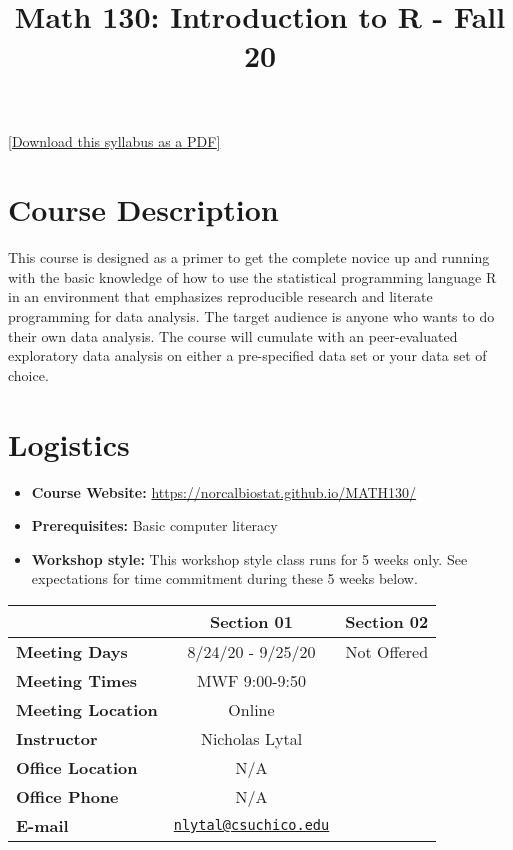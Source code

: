 \documentclass[
  11pt,
]{article}
\title{Math 130: Introduction to R - Fall 20}
\author{}
\date{\vspace{-2.5em}}
\providecommand{\tightlist}{%
  \setlength{\itemsep}{0pt}\setlength{\parskip}{0pt}}
\begin{document}
\maketitle

\href{syllabus.pdf}{{[}Download this syllabus as a PDF{]}}

\hypertarget{course-description}{%
\section{Course Description}\label{course-description}}

This course is designed as a primer to get the complete novice up and
running with the basic knowledge of how to use the statistical
programming language R in an environment that emphasizes reproducible
research and literate programming for data analysis. The target audience
is anyone who wants to do their own data analysis. The course will
cumulate with an peer-evaluated exploratory data analysis on either a
pre-specified data set or your data set of choice.

\hypertarget{logistics}{%
\section{Logistics}\label{logistics}}

\begin{itemize}
\tightlist
\item
  \textbf{Course Website:}
  \url{https://norcalbiostat.github.io/MATH130/}
\item
  \textbf{Prerequisites:} Basic computer literacy
\item
  \textbf{Workshop style:} This workshop style class runs for 5 weeks
  only. See expectations for time commitment during these 5 weeks below.
\end{itemize}

\begin{longtable}[]{@{}lcc@{}}
\toprule
& Section 01 & Section 02\tabularnewline
\midrule
\endhead
\textbf{Meeting Days} & 8/24/20 - 9/25/20 & Not Offered\tabularnewline
\textbf{Meeting Times} & MWF 9:00-9:50 &\tabularnewline
\textbf{Meeting Location} & Online &\tabularnewline
\textbf{Instructor} & Nicholas Lytal &\tabularnewline
\textbf{Office Location} & N/A &\tabularnewline
\textbf{Office Phone} & N/A &\tabularnewline
\textbf{E-mail} &
\href{mailto:nlytal@csuchico.edu}{\nolinkurl{nlytal@csuchico.edu}}
&\tabularnewline
\bottomrule
\end{longtable}
\end{document}
